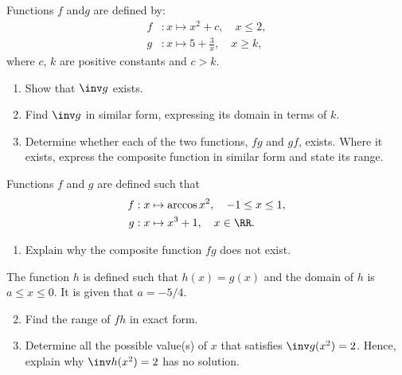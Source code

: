 \begin{problem}
    Functions $f$ and$ g$ are defined by:
    \begin{align*}
        f &: x \mapsto x^2 + c, \quad x \leq 2,\\
        g &: x \mapsto 5 + \frac3x, \quad x \geq k,
    \end{align*}
    where $c$, $k$ are positive constants and $c>k$.
    \begin{enumerate}
        \item Show that $\inv g$ exists.
        \item Find $\inv g$ in similar form, expressing its domain in terms of $k$.
        \item Determine whether each of the two functions, $fg$ and $gf$, exists. Where it exists, express the composite function in similar form and state its range.
    \end{enumerate}
\end{problem}

\begin{problem}[\chili]
    Functions $f$ and $g$ are defined such that    
    \begin{align*}
        f &: x \mapsto \arccos{x^2}, \quad -1 \leq x \leq 1,\\
        g &: x \mapsto x^3 + 1, \quad x \in \RR.
    \end{align*}

    \begin{enumerate}
        \item Explain why the composite function $fg$ does not exist.
    \end{enumerate}
    
    The function $h$ is defined such that $h(x) = g(x)$ and the domain of $h$ is $a \leq x \leq 0$. It is given that $a = -5/4$.

    \begin{enumerate}
        \setcounter{enumi}{1}
        \item Find the range of $fh$ in exact form.
        \item Determine all the possible value(s) of $x$ that satisfies $\inv g(x^2) = 2$. Hence, explain why $\inv h (x^2) = 2$ has no solution.
    \end{enumerate}
\end{problem}